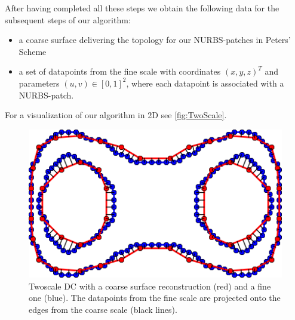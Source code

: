 After having completed all these steps we obtain the following data for the subsequent steps of our algorithm:
\begin{itemize}
\item a coarse surface delivering the topology for our \ac{NURBS}-patches in Peters' Scheme
\item a set of datapoints from the fine scale with coordinates $\left(x,y,z\right)^T$ and parameters $\left(u,v\right)\in\left[0,1\right]^2$, where each datapoint is associated with a \ac{NURBS}-patch. 
\end{itemize}
For a visualization of our algorithm in 2D see \autoref{fig:TwoScale}.

\begin{figure}
\begin{center}
\includegraphics[width=.5 \textwidth]{Pictures/SurfaceReconstruction/TwoScale}
\caption{Twoscale \acl{DC} with a coarse surface reconstruction (red) and a fine one (blue). The datapoints from the fine scale are projected onto the edges from the coarse scale (black lines).}
\label{fig:TwoScale}
\end{center}
\end{figure}

